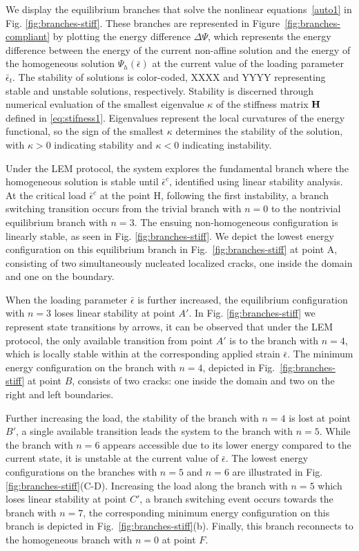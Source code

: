 We display the equilibrium branches that solve the nonlinear equations~\ref{auto1} in Fig. \ref{fig:branches-stiff}. These branches are represented in Figure~\ref{fig:branches-compliant} by plotting the energy difference $\Delta \Psi$, which represents the energy difference between the energy of the current non-affine solution and the energy of the homogeneous solution $\Psi_h(\bar{\epsilon})$ at the current value of the loading parameter $\bar\epsilon_t$. The stability of solutions is color-coded, XXXX and YYYY representing stable and unstable solutions, respectively. Stability is discerned through numerical evaluation of the smallest eigenvalue $\kappa$ of the stiffness matrix $\mathbf{H}$ defined in \eqref{eq:stifness1}. Eigenvalues represent the local curvatures of the energy functional, so the sign of the smallest  $\kappa$ determines the stability of the solution, with $\kappa > 0$ indicating stability and $\kappa < 0$ indicating instability.

Under the LEM protocol, the system explores the fundamental branch where the homogeneous solution is stable until $\bar\epsilon^c$, identified using linear stability analysis. At the critical load $\bar\epsilon^c$  at the point H, following the first instability, a branch switching transition occurs from the trivial branch with $n = 0$ to the nontrivial equilibrium branch with $n = 3$. The ensuing non-homogeneous configuration is linearly stable, as seen in Fig. \ref{fig:branches-stiff}. We depict the lowest energy configuration on this equilibrium branch in Fig.~\ref{fig:branches-stiff} at point A, consisting of two simultaneously nucleated localized cracks, one inside the domain and one on the boundary. 

When the loading parameter $\bar{\epsilon}$ is further increased, the equilibrium configuration with $n=3$ loses linear stability at point $A'$. In Fig. \ref{fig:branches-stiff} we represent state transitions by arrows, it can be observed that under the LEM protocol, the only available transition from point $A'$ is to the branch with $n=4$, which is locally stable within at the corresponding applied strain $\bar{\epsilon}$. The minimum energy configuration on the branch with $n=4$, depicted in Fig.~\ref{fig:branches-stiff} at point $B$, consists of two cracks: one inside the domain and two on the right and left boundaries.

Further increasing the load, the stability of the branch with $n=4$ is lost at point $B'$, a single available transition leads the system to the branch with $n=5$. While the branch with $n=6$ appears accessible due to its lower energy compared to the current state, it is unstable at the current value of $\bar\epsilon$. The lowest energy configurations on the branches with $n=5$ and $n=6$ are illustrated in Fig. \ref{fig:branches-stiff}(C-D). Increasing the load along the branch with $n=5$ which loses linear stability at point $C'$, a branch switching event occurs towards the branch with $n=7$, the corresponding minimum energy configuration on this branch is depicted in Fig.~\ref{fig:branches-stiff}(b). Finally, this branch reconnects to the homogeneous branch with $n=0$ at point $F$.

